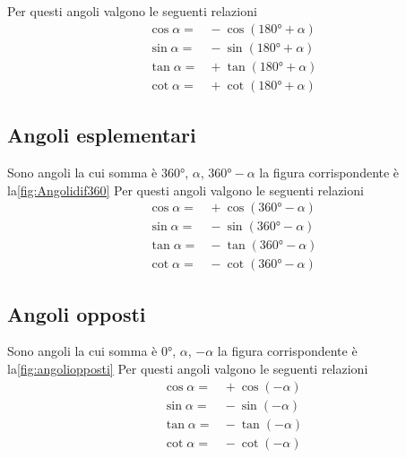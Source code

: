 Per questi angoli valgono le seguenti relazioni
\begin{align*}
\cos\alpha=&{}-\cos(\ang{180}+\alpha)\\
\sin\alpha=&{}-\sin(\ang{180}+\alpha)\\
\tan\alpha=&{}+\tan(\ang{180}+\alpha)\\
\cot\alpha=&{}+\cot(\ang{180}+\alpha)
\end{align*}
\subsection{Angoli esplementari}
Sono angoli la cui somma è $\ang{360}$, $\alpha$, $\ang{360}-\alpha$ la figura corrispondente è la\nobs\vref{fig:Angolidif360}
Per questi angoli valgono le seguenti relazioni
\begin{align*}
\cos\alpha=&{}+\cos(\ang{360}-\alpha)\\
\sin\alpha=&{}-\sin(\ang{360}-\alpha)\\
\tan\alpha=&{}-\tan(\ang{360}-\alpha)\\
\cot\alpha=&{}-\cot(\ang{360}-\alpha)
\end{align*}
\subsection{Angoli opposti}
Sono angoli la cui somma è $\ang{0}$, $\alpha$, $-\alpha$ la figura corrispondente è la\nobs\vref{fig:angoliopposti}
Per questi angoli valgono le seguenti relazioni
\begin{align*}
\cos\alpha=&{}+\cos(-\alpha)\\
\sin\alpha=&{}-\sin(-\alpha)\\
\tan\alpha=&{}-\tan(-\alpha)\\
\cot\alpha=&{}-\cot(-\alpha)
\end{align*}
